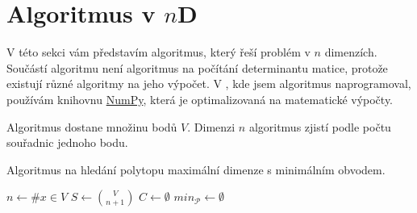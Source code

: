 \section{Algoritmus v \texorpdfstring{$n$D}{nD}}
V této sekci vám představím algoritmus, který řeší problém v $n$ dimenzích. Součástí algoritmu není algoritmus na počítání determinantu matice, protože existují různé algoritmy na jeho výpočet. V , kde jsem algoritmus naprogramoval, používám knihovnu \href{https://numpy.org/doc/stable/index.html}{NumPy}, která je optimalizovaná na matematické výpočty. 

Algoritmus dostane množinu bodů $V$. Dimenzi $n$ algoritmus zjistí podle počtu souřadnic jednoho bodu.

\begin{algorithm}[H]
    \caption{Algoritmus na hledání polytopu maximální dimenze s minimálním obvodem.}
    \label{alg:algoritmus_nd}


    \BlankLine
    \BlankLine

    $n \leftarrow \#x \in V$ \;
    $S \leftarrow \binom{V}{n+1}$\;
    $C \leftarrow \emptyset$\; 
    $min_\mathcal{P} \leftarrow \emptyset$\;
    \KwReturn{$\emptyset$}\;
   \end{algorithm}